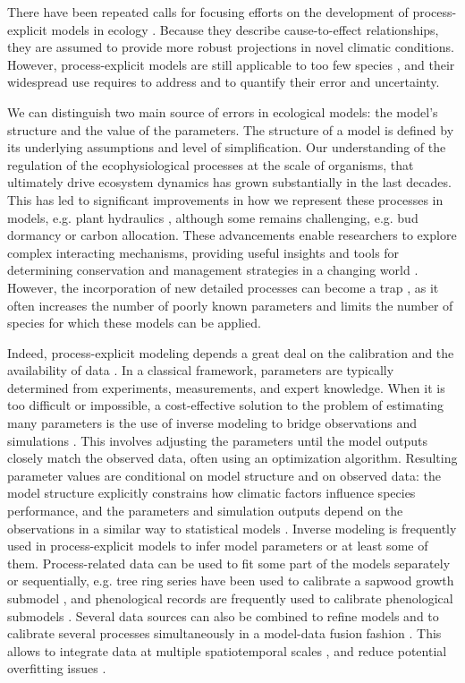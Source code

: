 There have been repeated calls for focusing efforts on the development of process-explicit models in ecology \citep{Urban2016, Singer2016, Pilowsky2022}. Because they describe cause-to-effect relationships, they are assumed to provide more robust projections in novel climatic conditions. However, process-explicit models are still applicable to too few species \citep{Evans2016}, and their widespread use requires to address and to quantify their error and uncertainty.

We can distinguish two main source of errors in ecological models: the model's structure and the value of the parameters. The structure of a model is defined by its underlying assumptions and level of simplification. Our understanding of the regulation of the ecophysiological processes at the scale of organisms, that ultimately drive  ecosystem dynamics has grown substantially in the last decades. This has led to significant improvements in how we represent these processes in models, e.g. plant hydraulics \citep{Ruffault2022} , although some remains challenging, e.g. bud dormancy \citep{Chuine2016} or carbon allocation. 
These advancements enable researchers to explore complex interacting mechanisms, providing useful insights and tools for determining conservation and management strategies in a changing world \citep{Urban2016}. However, the incorporation of new detailed processes can become a trap \citep{Franklin2020}, as it often increases the number of poorly known parameters and limits the number of species for which these models can be applied. %

Indeed, process-explicit modeling depends a great deal on the calibration and the availability of data \citep{Cabral2017}. In a classical framework, parameters are typically determined from experiments, measurements, and expert knowledge. When it is too difficult or impossible, a cost-effective solution to the problem of estimating many parameters is the use of inverse modeling to bridge observations and simulations \citep{Evans2016}. This involves adjusting the parameters until the model outputs closely match the observed data, often using an optimization algorithm. Resulting parameter values are conditional on model structure and on observed data: the model structure explicitly constrains how climatic factors influence species performance, and the parameters and simulation outputs depend on the observations in a similar way to statistical models \citep{Zhang2024}. Inverse modeling is frequently used in process-explicit models to infer model parameters or at least some of them. Process-related data can be used to fit some part of the models separately or sequentially, e.g. tree ring series have been used to calibrate a sapwood growth submodel \citep{DeCaceres2023}, and phenological records are frequently used to calibrate phenological submodels \citep{Chuine2013}. Several data sources can also be combined to refine models \citep{BenitoGarzon2019} and to calibrate several processes simultaneously in a model-data fusion fashion \citep[e.g.][]{Trotsiuk2020}. This allows to integrate data at multiple spatiotemporal scales \citep{Hartig2012, Niu2014}, and reduce potential overfitting issues \citep{Bacour2023}.

